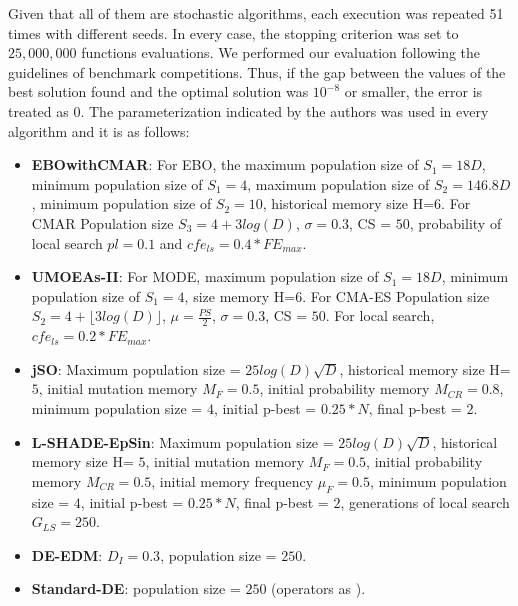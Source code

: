Given that all of them are stochastic algorithms, each execution was repeated 51 times with different seeds.
%
In every case, the stopping criterion was set to $25,000,000$ functions evaluations.
%
We performed our evaluation following the guidelines of \CEC{} benchmark competitions.
%
Thus, if the gap between the values of the best solution found and the optimal solution was $10^{-8}$ or smaller, the error is treated as $0$.
%
%
The parameterization indicated by the authors was used in every algorithm and it is as follows:
\begin{itemize}
\item \textbf{EBOwithCMAR}: For EBO, the maximum population size of $S_1 = 18D$, minimum population size of $S_1 = 4$, maximum population size of $S_2 = 146.8D$, minimum population size of $S_2 = 10$, historical memory size H=$6$. For CMAR Population size $S_3 = 4 + 3log(D)$, $\sigma=0.3$, CS = $50$, probability of local search $pl = 0.1$ and $cfe_{ls} = 0.4* FE_{max}$.
\item \textbf{UMOEAs-II}: For MODE, maximum population size of $S_1 = 18D$, minimum population size of $S_1 = 4$, size memory H=$6$. For CMA-ES Population size $S_2 = 4 + \lfloor 3log(D) \rfloor$, $\mu=\frac{PS}{2}$, $\sigma=0.3$, CS = $50$. For local search, $cfe_{ls} = 0.2 * FE_{max}$.
\item \textbf{jSO}: Maximum population size = $25log(D)\sqrt{D}$, historical memory size H= $5$, initial mutation memory $M_F = 0.5$, initial probability memory $M_{CR} = 0.8$, minimum population size = $4$, initial p-best = $0.25*N$, final p-best = $2$.
\item \textbf{L-SHADE-EpSin}: Maximum population size = $25log(D)\sqrt{D}$, historical memory size H= $5$, initial mutation memory $M_F = 0.5$, initial probability memory $M_{CR} = 0.5$, initial memory frequency $\mu_F = 0.5$, minimum population size = $4$, initial p-best = $0.25*N$, final p-best = $2$, generations of local search $G_{LS}=250$.
\item \textbf{ DE-EDM}: $D_I = 0.3$, population size = $250$.
\item \textbf{ Standard-DE}: population size = $250$ (operators as \DEEDM{}).
\end{itemize}
%

